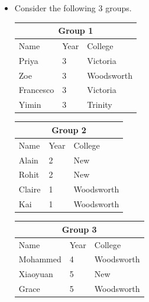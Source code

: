 \documentclass[12pt]{article}
\begin{document}
\begin{itemize}
    \item

    Consider the following 3 groups.

    \bigskip

    \begin{center}
        \centering
        \begin{tabular}{|p{2.5cm}|p{2.5cm}|p{2.5cm}|}
            \hline
            \multicolumn{3}{|c|}{\textbf{Group 1}}\\
            \hline
            Name & Year & College\\
            \hline
            Priya & 3 & Victoria\\
            \hline
            Zoe & 3 & Woodsworth\\
            \hline
            Francesco & 3 & Victoria\\
            \hline
            Yimin & 3 & Trinity\\
            \hline
        \end{tabular}

        \bigskip

        \begin{tabular}{|p{2.5cm}|p{2.5cm}|p{2.5cm}|}
            \hline
            \multicolumn{3}{|c|}{\textbf{Group 2}}\\
            \hline
            Name & Year & College\\
            \hline
            Alain & 2 & New\\
            \hline
            Rohit & 2 & New\\
            \hline
            Claire & 1 & Woodsworth\\
            \hline
            Kai & 1 & Woodsworth\\
            \hline
        \end{tabular}

        \bigskip

        \begin{tabular}{|p{2.5cm}|p{2.5cm}|p{2.5cm}|}
            \hline
            \multicolumn{3}{|c|}{\textbf{Group 3}}\\
            \hline
            Name & Year & College\\
            \hline
            Mohammed & 4 & Woodsworth\\
            \hline
            Xiaoyuan & 5 & New\\
            \hline
            Grace & 5 & Woodsworth\\
            \hline
        \end{tabular}
    \end{center}


\end{itemize}
\end{document}
